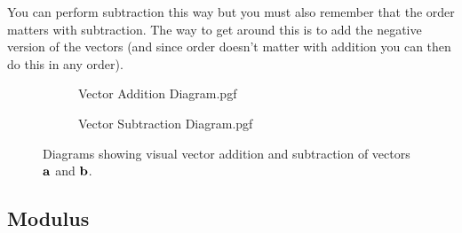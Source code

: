 \documentclass[main.tex]{subfiles}
\begin{document}
                    You can perform subtraction this way but you must also remember that the order matters with subtraction. The way to get around this is to add the negative version of the vectors (and since order doesn't matter with addition you can then do this in any order).

                    \begin{figure}[!h]
                        \centering
                        \begin{subfigure}[t]{0.45\textwidth}
                            \centering
                            \scalebox{0.8}
                            {
                            \begin{adjustbox}{clip,trim=35mm 10mm 15mm 10mm}
                                {{Vector Addition Diagram.pgf}}
                            \end{adjustbox}
                            }
                        \end{subfigure}
                        \hspace{2em}
                        \begin{subfigure}[t]{0.45\textwidth}
                            \centering
                            \scalebox{0.8}
                            {
                            \begin{adjustbox}{clip,trim=35mm 10mm 15mm 10mm}
                                {{Vector Subtraction Diagram.pgf}}
                            \end{adjustbox}
                            }
                        \end{subfigure}
                        \vspace{-5mm}
                        \caption{Diagrams showing visual vector addition and subtraction of vectors $\boldsymbol{\mathbf{a}}$ and $\boldsymbol{\mathbf{b}}$.}
                        \label{fig: Visual Vector Addition}
                    \end{figure}


            \newpage

            \subsection{Modulus}
                \label{subsec: Modulus}
\end{document}
